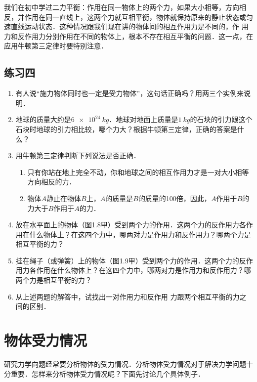 我们在初中学过二力平衡：作用在同一物体上的两个力，如果大小相等，方向相反，并作用在同一直线上，这两个力就互相平衡，物体就保持原来的静止状态或匀速直线运动状态．这种情况跟我们现在讲的物体间的相互作用力是不同的，作
用力和反作用力分别作用在不同的物体上，根本不存在相互平衡的问题．这一点，在应用牛顿第三定律时要特别注意．

\subsection*{练习四}
\begin{enumerate}
    \item  有人说“施力物体同时也一定是受力物体”，这句话正确吗？用两三个实例来说明．
    \item  地球的质量大约是$\qty{6e24}{kg}$．地球对地面上质量是$\qty{1}{kg}$的石块的引力跟这个石块时地球的引力相比较，哪个力大？根据牛顿第三定律，正确的答案是什么？
    \item  用牛顿第三定律判断下列说法是否正确．
          \begin{enumerate}
              \item  只有你站在地上完全不动，你和地球之间的相互作用力才是一对大小相等方向相反的力．
              \item  物体$A$静止在物体$B$上，$A$的质量是$B$的质量的100倍，因此，$A$作用于$B$的力大于$B$作用于$A$的力．
          \end{enumerate}
    \item  放在水平面上的物体（图1.8甲）受到两个力的作用．这两个力的反作用力各作用在什么物体上？在这四个力中，哪两对力是作用力和反作用力？哪两个力是相互平衡的力？
    \item  挂在绳子（或弹簧）上的物体（图1.9甲）受到两个力的作用．这两个力的反作用力各作用在什么物体上？在这四个力中，哪两对力是作用力和反作用力？哪两个力是相互平衡的力？
    \item 从上述两题的解答中，试找出一对作用力和反作用
          力跟两个相互平衡的力之间的区别．
\end{enumerate}

\newpage

\section{物体受力情况}

研究力学向题经常要分析物体的受力情况．分析物体受力情况对于解决力学问题十分重要．怎样来分析物体受力情况呢？下面先讨论几个具体例子．

